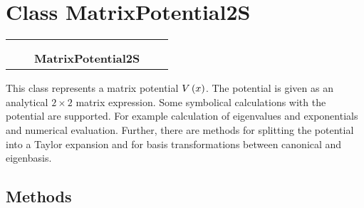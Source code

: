 
\section{Class MatrixPotential2S}

    \label{MatrixPotential2S:MatrixPotential2S}
\begin{tabular}{cccccc}
\multicolumn{2}{r}{\settowidth{\BCL}{MatrixPotential}\multirow{2}{\BCL}{MatrixPotential}}
&&
  \\\cline{3-3}
  &&\multicolumn{1}{c|}{}
&&
  \\
&&\multicolumn{2}{l}{\textbf{MatrixPotential2S}}
\end{tabular}

This class represents a matrix potential $V\left( x \right)$. The
potential is given as an analytical $2 \times 2$ matrix expression.
Some symbolical calculations with the potential are supported. For example
calculation of eigenvalues and exponentials and numerical evaluation.
Further, there are methods for splitting the potential into a Taylor
expansion and for basis transformations between canonical and eigenbasis.



  \subsection{Methods}

    \vspace{0.5ex}

